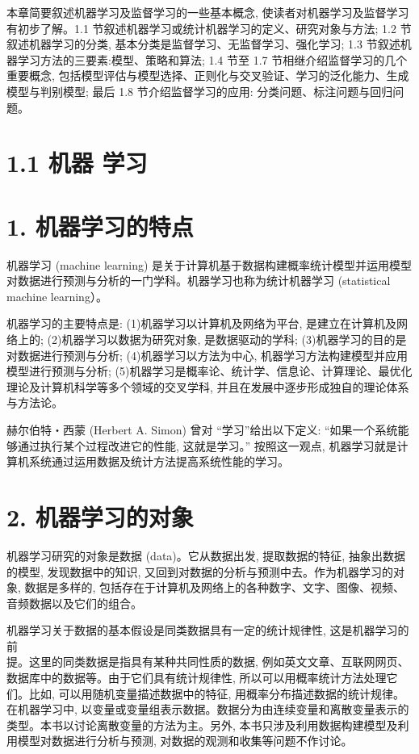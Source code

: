 \documentclass[10pt]{article}
\begin{document}
\begin{CJK*}{UTF8}{bsmi}
本章简要叙述机器学习及监督学习的一些基本概念, 使读者对机器学习及监督学习有初步了解。1.1 节叙述机器学习或统计机器学习的定义、研究对象与方法; 1.2 节叙述机器学习的分类, 基本分类是监督学习、无监督学习、强化学习; 1.3 节叙述机器学习方法的三要素:模型、策略和算法; 1.4 节至 1.7 节相继介绍监督学习的几个重要概念, 包括模型评估与模型选择、正则化与交叉验证、学习的泛化能力、生成模型与判别模型; 最后 1.8 节介绍监督学习的应用: 分类问题、标注问题与回归问题。

\section*{1.1 机器 学习}
\section*{1. 机器学习的特点}
机器学习 (machine learning) 是关于计算机基于数据构建概率统计模型并运用模型对数据进行预测与分析的一门学科。机器学习也称为统计机器学习 (statistical machine learning）。

机器学习的主要特点是: (1)机器学习以计算机及网络为平台, 是建立在计算机及网络上的; (2)机器学习以数据为研究对象, 是数据驱动的学科; (3)机器学习的目的是对数据进行预测与分析; (4)机器学习以方法为中心, 机器学习方法构建模型并应用模型进行预测与分析; (5)机器学习是概率论、统计学、信息论、计算理论、最优化理论及计算机科学等多个领域的交叉学科, 并且在发展中逐步形成独自的理论体系与方法论。

赫尔伯特・西蒙 (Herbert A. Simon) 曾对 “学习”给出以下定义: “如果一个系统能够通过执行某个过程改进它的性能, 这就是学习。” 按照这一观点, 机器学习就是计算机系统通过运用数据及统计方法提高系统性能的学习。

\section*{2. 机器学习的对象}
机器学习研究的对象是数据 (data)。它从数据出发, 提取数据的特征, 抽象出数据的模型, 发现数据中的知识, 又回到对数据的分析与预测中去。作为机器学习的对象, 数据是多样的, 包括存在于计算机及网络上的各种数字、文字、图像、视频、音频数据以及它们的组合。

机器学习关于数据的基本假设是同类数据具有一定的统计规律性, 这是机器学习的前\\
提。这里的同类数据是指具有某种共同性质的数据, 例如英文文章、互联网网页、数据库中的数据等。由于它们具有统计规律性, 所以可以用概率统计方法处理它们。比如, 可以用随机变量描述数据中的特征, 用概率分布描述数据的统计规律。在机器学习中, 以变量或变量组表示数据。数据分为由连续变量和离散变量表示的类型。本书以讨论离散变量的方法为主。另外, 本书只涉及利用数据构建模型及利用模型对数据进行分析与预测, 对数据的观测和收集等问题不作讨论。


\end{CJK*}
\end{document}
